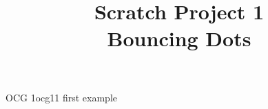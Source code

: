 \documentclass{article}
\title{Scratch Project 1\\Bouncing Dots}
\author{}
\date{}
\begin{document}
    \maketitle

    \begin{ocg}{OCG 1}{ocg1}{1}
        first example
    \end{ocg}

        
    
    \begin{minipage}{0.5\linewidth}
        \begin{scratch}
        \end{scratch}
    \end{minipage}
\end{document}
